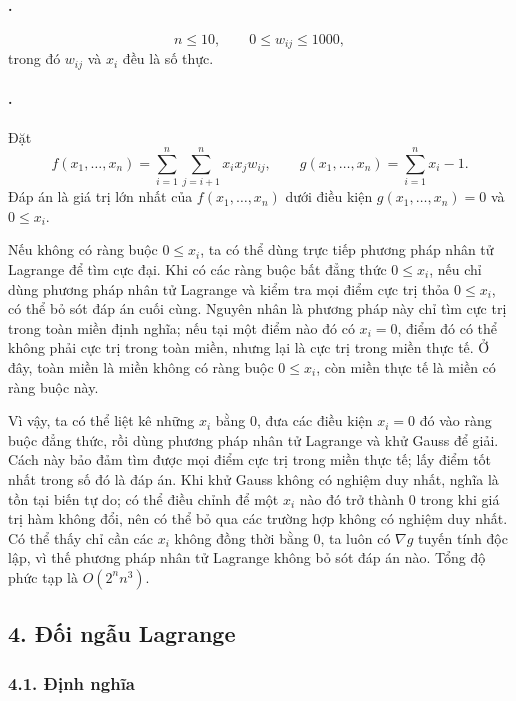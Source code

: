 \documentclass[11pt]{article}
\begin{document}
\paragraph{.}
\[
  n\le 10,\qquad 0\le w_{ij}\le 1000,
\]
trong đó \(w_{ij}\) và \(x_i\) đều là số thực.

\paragraph{.}
Đặt
\[
  f(x_1,\ldots,x_n)=\sum_{i=1}^{n}\sum_{j=i+1}^{n}x_i x_j w_{ij},\qquad
  g(x_1,\ldots,x_n)=\sum_{i=1}^{n}x_i-1.
\]
Đáp án là giá trị lớn nhất của \(f(x_1,\ldots,x_n)\) dưới điều kiện
\(g(x_1,\ldots,x_n)=0\) và \(0\le x_i\).

Nếu không có ràng buộc \(0\le x_i\), ta có thể dùng trực tiếp phương pháp nhân
tử Lagrange để tìm cực đại. Khi có các ràng buộc bất đẳng thức \(0\le x_i\),
nếu chỉ dùng phương pháp nhân tử Lagrange và kiểm tra mọi điểm cực trị thỏa
\(0\le x_i\), có thể bỏ sót đáp án cuối cùng. Nguyên nhân là phương pháp này
chỉ tìm cực trị trong toàn miền định nghĩa; nếu tại một điểm nào đó có
\(x_i=0\), điểm đó có thể không phải cực trị trong toàn miền, nhưng lại là cực
trị trong miền thực tế. Ở đây, toàn miền là miền không có ràng buộc
\(0\le x_i\), còn miền thực tế là miền có ràng buộc này.

Vì vậy, ta có thể liệt kê những \(x_i\) bằng \(0\), đưa các điều kiện
\(x_i=0\) đó vào ràng buộc đẳng thức, rồi dùng phương pháp nhân tử Lagrange và
khử Gauss để giải. Cách này bảo đảm tìm được mọi điểm cực trị trong miền thực
tế; lấy điểm tốt nhất trong số đó là đáp án. Khi khử Gauss không có nghiệm duy
nhất, nghĩa là tồn tại biến tự do; có thể điều chỉnh để một \(x_i\) nào đó trở
thành \(0\) trong khi giá trị hàm không đổi, nên có thể bỏ qua các trường hợp
không có nghiệm duy nhất. Có thể thấy chỉ cần các \(x_i\) không đồng thời bằng
\(0\), ta luôn có \(\nabla g\) tuyến tính độc lập, vì thế phương pháp nhân tử
Lagrange không bỏ sót đáp án nào. Tổng độ phức tạp là \(O(2^n n^3)\).

\subsection*{4. Đối ngẫu Lagrange}

\subsubsection*{4.1. Định nghĩa}
\end{document}
